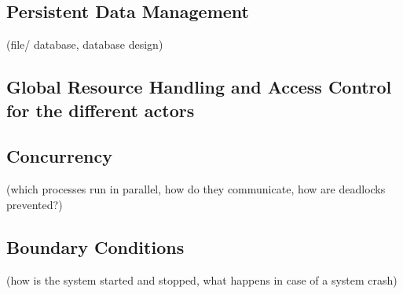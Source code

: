 \documentclass[a4paper]{article}
\begin{document}
\subsection{Persistent Data Management}
(file/ database, database design)
\subsection{Global Resource Handling and Access Control for the different actors}
\subsection{Concurrency}
(which processes run in parallel, how do they communicate, how are deadlocks prevented?)
\subsection{Boundary Conditions}
(how is the system started and stopped, what happens
in case of a system crash)
\end{document}
